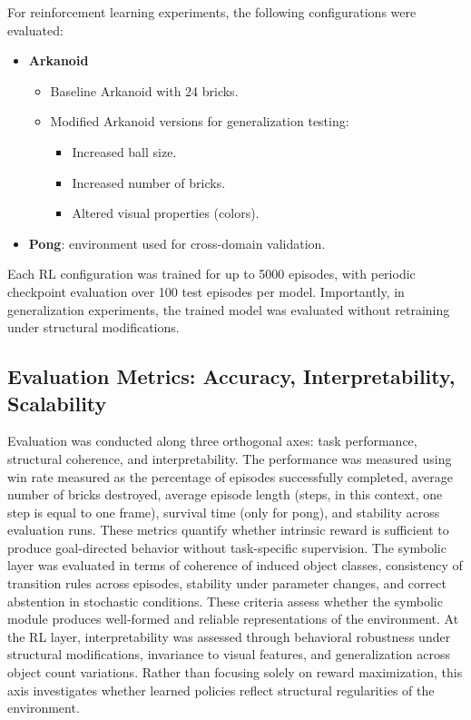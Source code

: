 \documentclass[12pt,a4paper]{report}
\begin{document}
\noindent For reinforcement learning experiments, the following configurations were evaluated:
\begin{itemize}
    \item \textbf{Arkanoid}
    \begin{itemize}
        \item Baseline Arkanoid with 24 bricks.
        \item Modified Arkanoid versions for generalization testing:
        \begin{itemize}
            \item Increased ball size.
            \item Increased number of bricks.
            \item Altered visual properties (colors).
        \end{itemize}
    \end{itemize}
    
    \item \textbf{Pong}: environment used for cross-domain validation.
\end{itemize}


\noindent Each RL configuration was trained for up to 5000 episodes, with periodic checkpoint evaluation over 100 test episodes per model.
Importantly, in generalization experiments, the trained model was evaluated without retraining under structural modifications.

\subsection{Evaluation Metrics: Accuracy, Interpretability, Scalability}
Evaluation was conducted along three orthogonal axes: task performance, structural coherence, and interpretability.
The performance was measured using win rate measured as the percentage of episodes successfully completed, average number of bricks destroyed, average episode length (steps, in this context, one step is equal to one frame), survival time (only for pong), and stability across evaluation runs. These metrics quantify whether intrinsic reward is sufficient to produce goal-directed behavior without task-specific supervision.
The symbolic layer was evaluated in terms of coherence of induced object classes, consistency of transition rules across episodes, stability under parameter changes, and correct abstention in stochastic conditions. These criteria assess whether the symbolic module produces well-formed and reliable representations of the environment.
At the RL layer, interpretability was assessed through behavioral robustness under structural modifications, invariance to visual features, and generalization across object count variations. Rather than focusing solely on reward maximization, this axis investigates whether learned policies reflect structural regularities of the environment.
\end{document}
